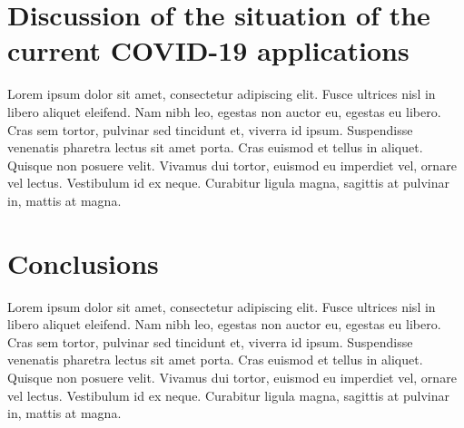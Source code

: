 \documentclass[a4paper, 12pt]{article}
\begin{document}

\section{Discussion of the situation of the current COVID-19 applications}
\label{section:discussion}

Lorem ipsum dolor sit amet, consectetur adipiscing elit. Fusce ultrices nisl in libero aliquet eleifend. Nam nibh leo, egestas non auctor eu, egestas eu libero. Cras sem tortor, pulvinar sed tincidunt et, viverra id ipsum. Suspendisse venenatis pharetra lectus sit amet porta. Cras euismod et tellus in aliquet. Quisque non posuere velit. Vivamus dui tortor, euismod eu imperdiet vel, ornare vel lectus. Vestibulum id ex neque. Curabitur ligula magna, sagittis at pulvinar in, mattis at magna.


\section{Conclusions}
\label{section:conclusions}

Lorem ipsum dolor sit amet, consectetur adipiscing elit. Fusce ultrices nisl in libero aliquet eleifend. Nam nibh leo, egestas non auctor eu, egestas eu libero. Cras sem tortor, pulvinar sed tincidunt et, viverra id ipsum. Suspendisse venenatis pharetra lectus sit amet porta. Cras euismod et tellus in aliquet. Quisque non posuere velit. Vivamus dui tortor, euismod eu imperdiet vel, ornare vel lectus. Vestibulum id ex neque. Curabitur ligula magna, sagittis at pulvinar in, mattis at magna.





\nocite{*}
\end{document}
